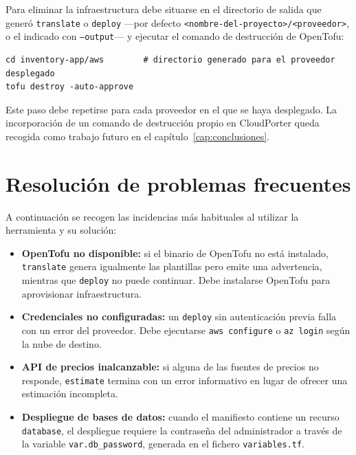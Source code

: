 Para eliminar la infraestructura debe situarse en el directorio de salida que generó
\texttt{translate} o \texttt{deploy} —por defecto \texttt{<nombre-del-proyecto>/<proveedor>}, o el
indicado con \texttt{--output}— y ejecutar el comando de destrucción de OpenTofu:

\begin{lstlisting}
cd inventory-app/aws        # directorio generado para el proveedor desplegado
tofu destroy -auto-approve
\end{lstlisting}

Este paso debe repetirse para cada proveedor en el que se haya desplegado. La incorporación de un
comando de destrucción propio en CloudPorter queda recogida como trabajo futuro en el
capítulo~\ref{cap:conclusiones}.

\section*{Resolución de problemas frecuentes}

A continuación se recogen las incidencias más habituales al utilizar la herramienta y su solución:

\begin{itemize}
    \item \textbf{OpenTofu no disponible:} si el binario de OpenTofu no está instalado,
    \texttt{translate} genera igualmente las plantillas pero emite una advertencia, mientras que
    \texttt{deploy} no puede continuar. Debe instalarse OpenTofu para aprovisionar infraestructura.
    \item \textbf{Credenciales no configuradas:} un \texttt{deploy} sin autenticación previa falla
    con un error del proveedor. Debe ejecutarse \texttt{aws configure} o \texttt{az login} según la
    nube de destino.
    \item \textbf{API de precios inalcanzable:} si alguna de las fuentes de precios no responde,
    \texttt{estimate} termina con un error informativo en lugar de ofrecer una estimación
    incompleta.
    \item \textbf{Despliegue de bases de datos:} cuando el manifiesto contiene un recurso
    \texttt{database}, el despliegue requiere la contraseña del administrador a través de la
    variable \texttt{var.db\_password}, generada en el fichero \texttt{variables.tf}.
\end{itemize}

